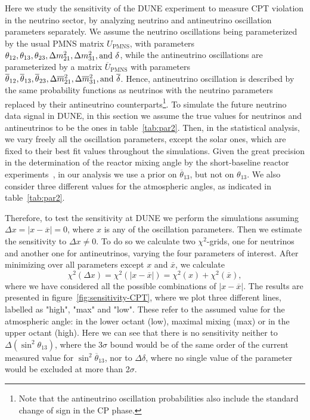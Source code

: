 Here we study the sensitivity of the DUNE experiment to measure CPT violation in the neutrino sector, by analyzing neutrino and antineutrino oscillation parameters separately. We assume the neutrino oscillations being parameterized by the usual PMNS matrix $U_{\text{PMNS}}$, with parameters $\theta_{12},\theta_{13},\theta_{23},\Delta m_{21}^2,\Delta m_{31}^2, {\rm and}~\delta$, while the antineutrino oscillations are parameterized by a matrix $\overline{U}_{\text{PMNS}}$ with parameters $\overline{\theta}_{12},\overline{\theta}_{13},\overline{\theta}_{23},\Delta \overline{m}_{21}^2,\Delta \overline{m}_{31}^2, {\rm and}~\overline{\delta}$. Hence, antineutrino oscillation is described  by the same probability functions as neutrinos with the neutrino parameters replaced by their antineutrino counterparts\footnote{Note that the antineutrino oscillation probabilities also include the standard change of sign in the CP phase.}. 
To simulate the future neutrino data signal in DUNE, in this section we assume the true values for neutrinos and antineutrinos to be the ones in table~\ref{tab:par2}.
Then, in the statistical analysis, we vary freely all the oscillation parameters, except the solar ones, which are fixed to their best fit values throughout the simulations. Given the great precision in the determination of the reactor mixing angle by the short-baseline reactor experiments~\cite{An:2016ses,RENO:2015ksa,Abe:2014bwa}, in our analysis we use a prior on $\overline{\theta}_{13}$, but not on $\theta_{13}$. We also consider three different values for the atmospheric angles, as indicated in table~\ref{tab:par2}. 

Therefore, to test the sensitivity at DUNE we perform the simulations assuming $\Delta x = |x-\overline{x}| = 0$, where $x$ is any of the oscillation parameters. Then we estimate the sensitivity to $\Delta x\neq 0$. To do so we calculate two $\chi^2$-grids, one for neutrinos and another one for antineutrinos, varying the four parameters of interest. After minimizing over all parameters except $x$ and $\overline{x}$, we calculate 
%
\begin{equation}
 \chi^2(\Delta x) = \chi^2(|x-\overline{x}|) = \chi^2(x)+\chi^2(\overline{x}),
 \label{eq:chi2-nu-nubar}
\end{equation}
%
where we have considered all the possible combinations of $|x-\overline{x}|$. The results are presented in figure~\ref{fig:sensitivity-CPT}, where we plot three different lines, labelled as "high", "max" and "low". These refer to the assumed value for the atmospheric angle: in the lower octant (low), maximal mixing (max) or in the upper octant (high). Here we can see that there is no sensitivity neither to $\Delta(\sin^2\theta_{13})$, where the 3$\sigma$ bound would be of the same order of the current measured value for $\sin^2\overline{\theta}_{13}$, nor to $\Delta\delta$, where no single value of the parameter would be excluded at more than 2$\sigma$.


